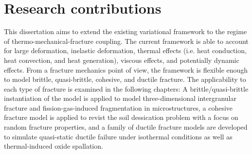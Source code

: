 \section{Research contributions}

This dissertation aims to extend the existing variational framework to the regime of thermo-mechanical-fracture coupling. The current framework is able to account for large deformation, inelastic deformation, thermal effects (i.e. heat conduction, heat convection, and heat generation), viscous effects, and potentially dynamic effects. From a fracture mechanics point of view, the framework is flexible enough to model brittle, quasi-brittle, cohesive, and ductile fracture. The applicability to each type of fracture is examined in the following chapters: A brittle/quasi-brittle instantiation of the model is applied to model three-dimensional intergranular fracture and fission-gas-induced fragmentation in microstructures, a cohesive fracture model is applied to revist the soil dessication problem with a focus on random fracture properties, and a family of ductile fracture models are developed to simulate quasi-static ductile failure under isothermal conditions as well as thermal-induced oxide spallation.


